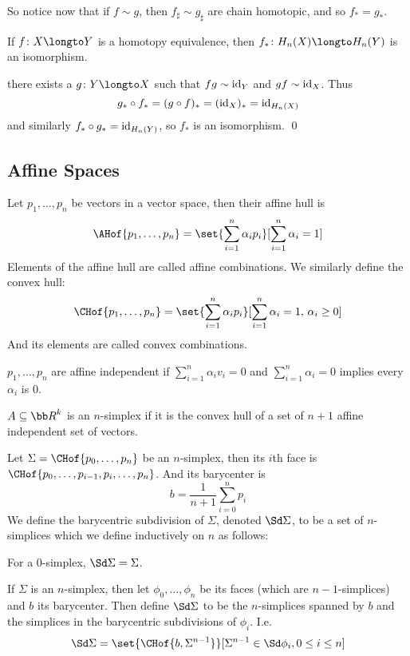 So notice now that if $f\sim g$, then $f_\sharp\sim g_\sharp$ are chain homotopic, and so $f_*=g_*$.

\bcoro

    If $f\colon X\longto Y$ is a homotopy equivalence, then $f_*\colon H_n(X)\longto H_n(Y)$ is an isomorphism.

\ecoro

\Proof there exists a $g\colon Y\longto X$ such that $fg\sim{\rm id}_Y$ and $gf\sim{\rm id}_X$.
Thus
$$ g_*\circ f_* = (g\circ f)_* = ({\rm id}_X)_* = {\rm id}_{H_n(X)} $$
and similarly $f_*\circ g_*={\rm id}_{H_n(Y)}$, so $f_*$ is an isomorphism.
\qed

\subsection{Affine Spaces}

\bdefn

    Let $p_1,\dots,p_n$ be vectors in a vector space, then their {\emphcolor affine hull} is
    $$ \AHof{p_1,\dots,p_n} = \set{\sum_{i=1}^n\alpha_ip_i}[\sum_{i=1}^n\alpha_i=1] $$
    Elements of the affine hull are called {\emphcolor affine combinations}.
    We similarly define the {\emphcolor convex hull}:
    $$ \CHof{p_1,\dots,p_n} = \set{\sum_{i=1}^n\alpha_ip_i}[\sum_{i=1}^n\alpha_i=1,\,\alpha_i\geq0] $$
    And its elements are called {\emphcolor convex combinations}.

\edefn

\bdefn

    $p_1,\dots,p_n$ are {\emphcolor affine independent} if $\sum_{i=1}^n\alpha_iv_i=0$ and $\sum_{i=1}^n\alpha_i=0$ implies every $\alpha_i$ is $0$.

\edefn

\bdefn

    $A\subseteq{\bb R}^k$ is an {\emphcolor $n$-simplex} if it is the convex hull of a set of $n+1$ affine independent set of vectors.

\edefn

\bdefn

    Let $\Sigma=\CHof{p_0,\dots,p_n}$ be an $n$-simplex, then its $i$th {\emphcolor face} is $\CHof{p_0,\dots,p_{i-1},p_i,\dots,p_n}$.
    And its {\emphcolor barycenter} is
    $$ b = \frac1{n+1}\sum_{i=0}^np_i $$
    We define the {\emphcolor barycentric subdivision} of $\Sigma$, denoted $\Sd\Sigma$, to be a set of $n$-simplices which we define inductively on $n$ as follows:
    \benum
        \item For a $0$-simplex, $\Sd\Sigma=\Sigma$.
        \item If $\Sigma$ is an $n$-simplex, then let $\phi_0,\dots,\phi_n$ be its faces (which are $n-1$-simplices) and $b$ its barycenter.
            Then define $\Sd\Sigma$ to be the $n$-simplices spanned by $b$ and the simplices in the barycentric subdivisions of $\phi_i$.
            I.e.
            $$ \Sd\Sigma = \set{\CHof{b,\Sigma^{n-1}}}[\Sigma^{n-1}\in\Sd\phi_i,0\leq i\leq n] $$
    \eenum


